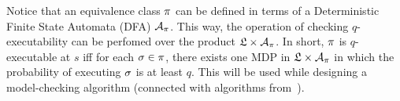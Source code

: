 \begin{remark}
    Notice that an equivalence class $\pi$ can be defined in terms of a Deterministic Finite State Automata (DFA) $\mathcal{A}_{\pi}$. This way, the operation of checking $q$-executability can be perfomed over the product $\mathfrak{L}\times\mathcal{A}_{\pi}$. In short, $\pi$ is $q$-executable at $s$ iff for each $\sigma\in\pi$, there exists one MDP in  $\mathfrak{L}\times\mathcal{A}_{\pi}$ in which the probability of executing $\sigma$ is at least $q$. This will be used while designing a model-checking algorithm (connected with algorithms from~\cite{AFSVQ21,AFSVQ23,DF23}).
\end{remark}